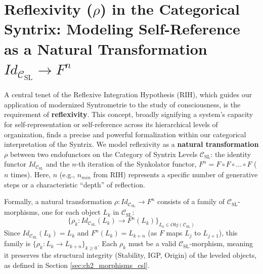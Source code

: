 \documentclass[
    12pt,              %
    a4paper,           %
    headings=normal,   %
    twoside=true,      %
    BCOR=8mm,          %
]{scrbook}
\newcommand{\q}[1]{\enquote{#1}}
\begin{document}
\section{Reflexivity (\(\rho\)) in the Categorical Syntrix: Modeling Self-Reference as a Natural Transformation \(Id_{\mathcal{C}_{\text{SL}}} \to F^n\)}
\label{sec:ch2_reflexivity_natural_transformation} 

A central tenet of the Reflexive Integration Hypothesis (RIH), which guides our application of modernized Syntrometrie to the study of consciousness, is the requirement of \textbf{reflexivity}. This concept, broadly signifying a system's capacity for self-representation or self-reference across its hierarchical levels of organization, finds a precise and powerful formalization within our categorical interpretation of the Syntrix. We model reflexivity as a \textbf{natural transformation \(\rho\)} between two endofunctors on the Category of Syntrix Levels \(\mathcal{C}_{\text{SL}}\): the identity functor \(Id_{\mathcal{C}_{\text{SL}}}\) and the \(n\)-th iteration of the Synkolator functor, \(F^n = F \circ F \circ \ldots \circ F\) (\(n\) times). Here, \(n\) (e.g., \(n_{min}\) from RIH) represents a specific number of generative steps or a characteristic \q{depth} of reflection.

Formally, a natural transformation \(\rho: Id_{\mathcal{C}_{\text{SL}}} \to F^n\) consists of a family of \(\mathcal{C}_{\text{SL}}\)-morphisms, one for each object \(L_k\) in \(\mathcal{C}_{\text{SL}}\):
\[ \{\rho_k: Id_{\mathcal{C}_{\text{SL}}}(L_k) \to F^n(L_k)\}_{L_k \in Obj(\mathcal{C}_{\text{SL}})} \]
Since \(Id_{\mathcal{C}_{\text{SL}}}(L_k) = L_k\) and \(F^n(L_k) = L_{k+n}\) (as \(F\) maps \(L_j\) to \(L_{j+1}\)), this family is \(\{\rho_k: L_k \to L_{k+n}\}_{k \ge 0}\). Each \(\rho_k\) must be a valid \(\mathcal{C}_{\text{SL}}\)-morphism, meaning it preserves the structural integrity (Stability, IGP, Origin) of the leveled objects, as defined in Section \ref{sec:ch2_morphisms_csl}.
\end{document}
